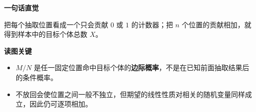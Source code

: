 \clearpage
\begin{explanationbox}
	\textbf{\textcolor{CExplanation}{一句话直觉}}

	把每个抽取位置看成一个只会贡献 $0$ 或 $1$ 的计数器；把 $n$ 个位置的贡献相加，就得到样本中的目标个体总数 $X$。

	

	\textbf{\textcolor{CExplanation}{读图关键}}
	\begin{itemize}[leftmargin=*, itemsep=0.45em, topsep=0.35em]
		\item $M/N$ 是任一固定位置命中目标个体的\textbf{边际概率}，不是在已知前面抽取结果后的条件概率。
		\item 不放回会使位置之间一般不独立，但期望的线性性质对相关的随机变量同样成立，因此仍可逐项相加。
	\end{itemize}
\end{explanationbox}
